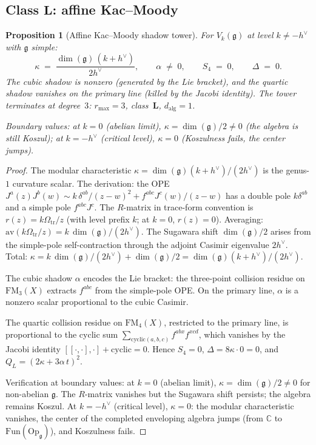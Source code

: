 \documentclass[11pt,reqno]{amsart}
\newtheorem{proposition}[theorem]{Proposition}
\theoremstyle{definition}
\theoremstyle{remark}
\newcommand{\FM}{\mathrm{FM}}
\newcommand{\fg}{\mathfrak{g}}
\numberwithin{equation}{section}
\begin{document}
\subsection{Class $\mathbf{L}$: affine
Kac--Moody}\label{subsec:km}

\begin{proposition}[Affine Kac--Moody shadow
tower]\label{prop:km}
For $V_k(\fg)$ at level $k \ne -h^\vee$ with $\fg$
simple:
\[
 \kappa
 \;=\;
 \frac{\dim(\fg)\,(k + h^\vee)}{2h^\vee},
 \qquad
 \alpha \;\ne\; 0,
 \qquad
 S_4 \;=\; 0,
 \qquad
 \Delta \;=\; 0.
\]
The cubic shadow is nonzero (generated by the Lie bracket),
and the quartic shadow vanishes on the primary line (killed
by the Jacobi identity). The tower terminates at
degree~$3$: $r_{\max} = 3$, class~$\mathbf{L}$,
$d_{\mathrm{alg}} = 1$.

Boundary values: at $k = 0$ (abelian limit),
$\kappa = \dim(\fg)/2 \ne 0$ (the algebra is still Koszul);
at $k = -h^\vee$ (critical level), $\kappa = 0$
(Koszulness fails, the center jumps).
\end{proposition}

\begin{proof}
The modular characteristic
$\kappa = \dim(\fg)(k + h^\vee)/(2h^\vee)$ is the genus-$1$
curvature scalar. The derivation: the OPE
$J^a(z)J^b(w) \sim k\,\delta^{ab}/(z-w)^2
+ f^{abc} J^c(w)/(z-w)$ has a double pole $k\delta^{ab}$ and
a simple pole $f^{abc} J^c$. The $R$-matrix in
trace-form convention is $r(z) = k\Omega_{\mathrm{tr}}/z$ (with level
prefix $k$; at $k = 0$, $r(z) = 0$). Averaging:
$\mathrm{av}(k\Omega_{\mathrm{tr}}/z) = k\,\dim(\fg)/(2h^\vee)$.
The Sugawara shift $\dim(\fg)/2$ arises from the
simple-pole self-contraction through the adjoint Casimir
eigenvalue $2h^\vee$. Total:
$\kappa = k\,\dim(\fg)/(2h^\vee) + \dim(\fg)/2
= \dim(\fg)(k + h^\vee)/(2h^\vee)$.

The cubic shadow $\alpha$ encodes the Lie bracket: the
three-point collision residue on $\FM_3(X)$ extracts
$f^{abc}$ from the simple-pole OPE. On the primary
line, $\alpha$ is a nonzero scalar proportional to the
cubic Casimir.

The quartic collision residue on $\FM_4(X)$, restricted
to the primary line, is proportional to the cyclic sum
$\sum_{\mathrm{cyclic}(a,b,c)} f^{abx} f^{xcd}$, which
vanishes by the Jacobi identity
$[[\cdot,\cdot],\cdot] + \mathrm{cyclic} = 0$.
Hence $S_4 = 0$, $\Delta = 8\kappa \cdot 0 = 0$, and
$Q_L = (2\kappa + 3\alpha\, t)^2$.

Verification at boundary values: at $k = 0$ (abelian
limit), $\kappa = \dim(\fg)/2 \ne 0$ for non-abelian $\fg$.
The $R$-matrix vanishes but the Sugawara shift persists;
the algebra remains Koszul. At $k = -h^\vee$ (critical
level), $\kappa = 0$: the modular characteristic vanishes,
the center of the completed enveloping algebra jumps (from
$\mathbb{C}$ to $\mathrm{Fun}(\mathrm{Op}_\fg)$), and
Koszulness fails.
\end{proof}
\end{document}
